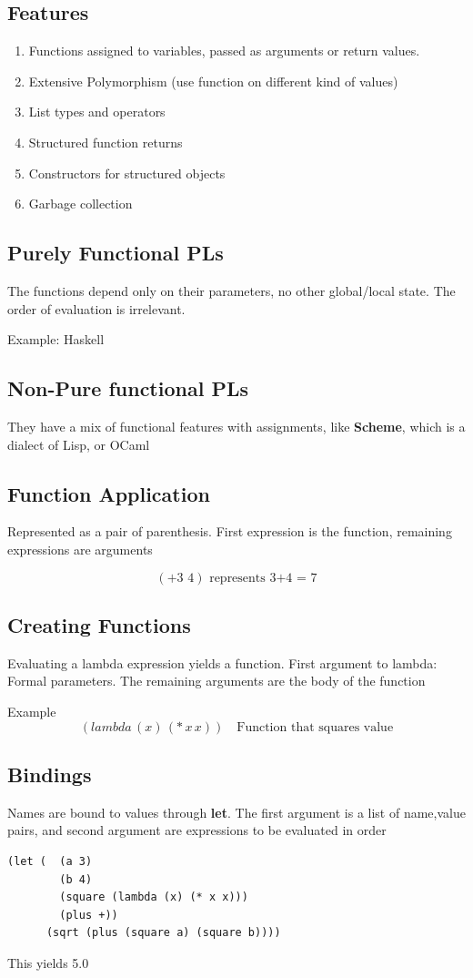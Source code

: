 \documentclass{article}
\begin{document}
\subsection{Features}
\begin{enumerate}
  \item Functions assigned to variables, passed as arguments or return values.
  \item Extensive Polymorphism (use function on different kind of values)
  \item List types and operators
  \item Structured function returns
  \item Constructors for structured objects
  \item Garbage collection
\end{enumerate}
\subsection{Purely Functional PLs}
The functions depend only on their parameters, no other global/local state. The order of evaluation is irrelevant.

Example: Haskell
\subsection{Non-Pure functional PLs}
They have a mix of functional features with assignments, like \textbf{Scheme}, which is a dialect of Lisp, or OCaml
\subsection{Function Application}
Represented as a pair of parenthesis. First expression is the function, remaining expressions are arguments

\[(+ 3\, \, 4) \text{ represents 3+4 = 7}\]
\subsection{Creating Functions}
Evaluating a lambda expression yields a function. First argument to lambda: Formal parameters. The remaining arguments are the body of the function

Example
\[(lambda \, (x) \, (* \,x \, x)) \quad \text{Function that squares value}\]
\subsection{Bindings}
Names are bound to values through \textbf{let}. The first argument is a list of name,value pairs, and second argument are expressions to be evaluated in order
\begin{lstlisting}
(let (  (a 3)
        (b 4)
        (square (lambda (x) (* x x)))
        (plus +))
      (sqrt (plus (square a) (square b))))
\end{lstlisting}
This yields 5.0
\end{document}
